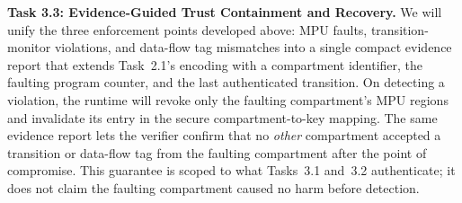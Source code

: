 \textbf{Task 3.3: Evidence-Guided Trust Containment and Recovery.}
We will unify the three enforcement points developed above: MPU faults, transition-monitor violations, and data-flow tag mismatches into a single compact evidence report that extends Task~2.1's encoding with a compartment identifier, the faulting program counter, and the last authenticated transition.
On detecting a violation, the runtime will revoke only the faulting compartment's MPU regions and invalidate its entry in the secure compartment-to-key mapping.
The same evidence report lets the verifier confirm that no \emph{other} compartment accepted a transition or data-flow tag from the faulting compartment after the point of compromise.
This guarantee is scoped to what Tasks~3.1 and~3.2 authenticate; it does not claim the faulting compartment caused no harm before detection.


